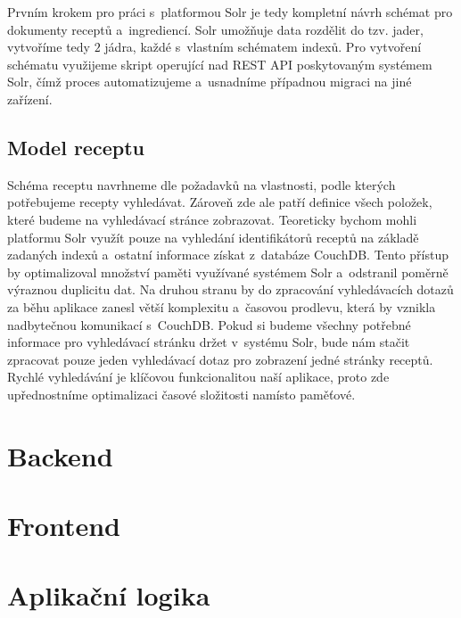 Prvním krokem pro práci s~platformou Solr je tedy kompletní návrh schémat pro dokumenty receptů a~ingrediencí. Solr umožňuje data rozdělit do tzv. jader, vytvoříme tedy $2$ jádra, každé s~vlastním schématem indexů. Pro vytvoření schématu využijeme skript operující nad REST API poskytovaným systémem Solr, čímž proces automatizujeme a~usnadníme případnou migraci na jiné zařízení.

\subsection{Model receptu}

Schéma receptu navrhneme dle požadavků na vlastnosti, podle kterých potřebujeme recepty vyhledávat. Zároveň zde ale patří definice všech položek, které budeme na vyhledávací stránce zobrazovat. Teoreticky bychom mohli platformu Solr využít pouze na vyhledání identifikátorů receptů na základě zadaných indexů a~ostatní informace získat z~databáze CouchDB. Tento přístup by optimalizoval množství paměti využívané systémem Solr a~odstranil poměrně výraznou duplicitu dat. Na druhou stranu by do zpracování vyhledávacích dotazů za běhu aplikace zanesl větší komplexitu a~časovou prodlevu, která by vznikla nadbytečnou komunikací s~CouchDB. Pokud si budeme všechny potřebné informace pro vyhledávací stránku držet v~systému Solr, bude nám stačit zpracovat pouze jeden vyhledávací dotaz pro zobrazení jedné stránky receptů. Rychlé vyhledávání je klíčovou funkcionalitou naší aplikace, proto zde upřednostníme optimalizaci časové složitosti namísto paměťové. 

\section{Backend}


\section{Frontend}


\section{Aplikační logika}